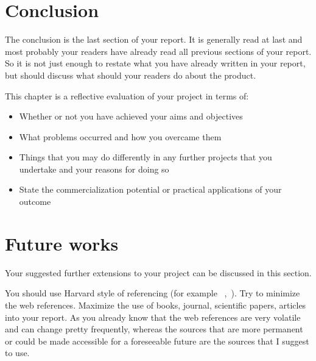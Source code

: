 \documentclass[12pt, a4paper]{report}
\begin{document}







\chapter{Conclusion} %
\label{cha:conclusion}

The conclusion is the last section of your report. It is generally read at last and most probably your readers have already read all previous sections of your report. So it is not just enough to restate what you have already written in your report, but should discuss what should your readers do about the product.

This chapter is a reflective evaluation of your project in terms of:
\begin{itemize}
  \item Whether or not you have achieved your aims and objectives
  \item What problems occurred and how you overcame them
  \item Things that you may do differently in any further projects that you undertake and your reasons for doing so
  \item State the commercialization potential or practical applications of your outcome
\end{itemize}

\chapter{Future works} %
\label{cha:future_works}
Your suggested further extensions to your project can be discussed in this section.


You should use Harvard style of referencing (for example ~\cite{dawson2005projects},~\cite{weaver2004success}). Try to minimize the web references. Maximize the use of books, journal, scientific papers, articles into your report. As you already know that the web references are very volatile and can change pretty frequently, whereas the sources that are more permanent or could be made accessible for a foreseeable future are the sources that I suggest to use.
\printbibliography
\end{document}
